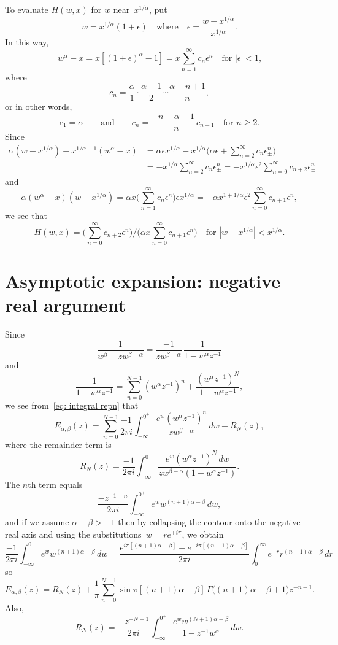 \documentclass[12pt,a4paper]{article}
\begin{document}
To evaluate $H(w,x)$ for $w$ near~$x^{1/\alpha}$, put
\[
w=x^{1/\alpha}(1+\epsilon)\quad\text{where}\quad 
\epsilon=\frac{w-x^{1/\alpha}}{x^{1/\alpha}}.
\]
In this way,
\[
w^\alpha-x=x[(1+\epsilon)^\alpha-1]=x\sum_{n=1}^\infty c_n\epsilon^n
    \quad\text{for $|\epsilon|<1$,}
\]
where
\[
c_n=\frac{\alpha}{1}\cdot\frac{\alpha-1}{2}\cdots\frac{\alpha-n+1}{n},
\]
or in other words,
\[
c_1=\alpha\qquad\text{and}\qquad c_n=-\frac{n-\alpha-1}{n}\,c_{n-1}
\quad\text{for $n\ge2$.}
\]
Since
\begin{align*}
\alpha(w-x^{1/\alpha})-x^{1/\alpha-1}(w^\alpha-x)
    &=\alpha\epsilon x^{1/\alpha}-x^{1/\alpha}
        \biggl(\alpha\epsilon+\sum_{n=2}^\infty c_n\epsilon_\pm^n\biggr)\\
    &=-x^{1/\alpha}\sum_{n=2}^\infty c_n\epsilon_\pm^n
    =-x^{1/\alpha}\epsilon^2\sum_{n=0}^\infty c_{n+2}\epsilon_\pm^n
\end{align*}
and
\[
\alpha(w^\alpha-x)(w-x^{1/\alpha})=\alpha x\biggl(\sum_{n=1}^\infty 
    c_n\epsilon^n\biggr)\epsilon x^{1/\alpha}
    =-\alpha x^{1+1/\alpha}\epsilon^2\sum_{n=0}^\infty c_{n+1}\epsilon^n,
\]
we see that
\[
H(w,x)=\biggl(\sum_{n=0}^\infty c_{n+2}\epsilon^n\biggr)\bigg/
    \biggl(\alpha x\sum_{n=0}^\infty c_{n+1}\epsilon^n\biggr)
    \quad\text{for $|w-x^{1/\alpha}|<x^{1/\alpha}$.}
\]
\section{Asymptotic expansion: negative real argument}
Since
\[
\frac{1}{w^\beta-zw^{\beta-\alpha}}=\frac{-1}{zw^{\beta-\alpha}}
    \,\frac{1}{1-w^\alpha z^{-1}}
\]
and
\[
\frac{1}{1-w^\alpha z^{-1}}=\sum_{n=0}^{N-1}(w^\alpha z^{-1})^n
    +\frac{(w^\alpha z^{-1})^N}{1-w^\alpha z^{-1}},
\]
we see from~\eqref{eq: integral repn} that
\[
E_{\alpha,\beta}(z)=\sum_{n=0}^{N-1}\frac{-1}{2\pi i}\int_{-\infty}^{0^+}
    \frac{e^w(w^\alpha z^{-1})^n}{zw^{\beta-\alpha}}\,dw+R_N(z),
\]
where the remainder term is
\[
R_N(z)=\frac{-1}{2\pi i}\int_{-\infty}^{0^+}
    \frac{e^w(w^\alpha z^{-1})^N\,dw}{zw^{\beta-\alpha}(1-w^\alpha z^{-1})}.
\]
The $n$th term equals
\[
\frac{-z^{-1-n}}{2\pi i}\int_{-\infty}^{0^+}e^w w^{(n+1)\alpha-\beta}\,dw,
\]
and if we assume $\alpha-\beta>-1$ then by collapsing the contour onto the 
negative real axis and using the substitutions~$w=re^{\pm i\pi}$, we obtain
\[
\frac{-1}{2\pi i}\int_{-\infty}^{0^+}e^w w^{(n+1)\alpha-\beta}\,dw
    =\frac{e^{i\pi[(n+1)\alpha-\beta]}-e^{-i\pi[(n+1)\alpha-\beta]}}{2\pi i}
    \int_0^\infty e^{-r}r^{(n+1)\alpha-\beta}\,dr
\]
so
\[
E_{\alpha,\beta}(z)=R_N(z)+\frac{1}{\pi}\sum_{n=0}^{N-1}
    \sin\pi[(n+1)\alpha-\beta]\,\Gamma\bigl((n+1)\alpha-\beta+1\bigr)z^{-n-1}.
\]
Also,
\begin{equation}\label{eq: RN(z)}
R_N(z)=\frac{-z^{-N-1}}{2\pi i}\int_{-\infty}^{0^+}
    \frac{e^w w^{(N+1)\alpha-\beta}}{1-z^{-1}w^\alpha}\,dw.
\end{equation}
\end{document}
